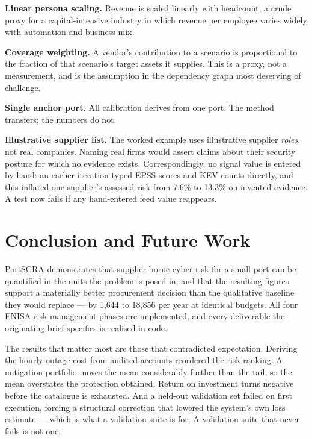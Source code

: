 \documentclass[conference]{IEEEtran}
\newcommand{\eur}{\mbox{\texteuro}}
\begin{document}
\textbf{Linear persona scaling.} Revenue is scaled linearly with headcount, a crude
proxy for a capital-intensive industry in which revenue per employee varies widely
with automation and business mix.

\textbf{Coverage weighting.} A vendor's contribution to a scenario is proportional
to the fraction of that scenario's target assets it supplies. This is a proxy, not a
measurement, and is the assumption in the dependency graph most deserving of
challenge.

\textbf{Single anchor port.} All calibration derives from one port. The method
transfers; the numbers do not.

\textbf{Illustrative supplier list.} The worked example uses illustrative supplier
\emph{roles}, not real companies. Naming real firms would assert claims about their
security posture for which no evidence exists. Correspondingly, no signal value is
entered by hand: an earlier iteration typed EPSS scores and KEV counts directly, and
this inflated one supplier's assessed risk from 7.6\% to 13.3\% on invented
evidence. A test now fails if any hand-entered feed value reappears.

\section{Conclusion and Future Work}

PortSCRA demonstrates that supplier-borne cyber risk for a small port can be
quantified in the units the problem is posed in, and that the resulting figures
support a materially better procurement decision than the qualitative baseline they
would replace --- by \eur{}1{,}644 to \eur{}18{,}856 per year at identical budgets.
All four ENISA risk-management phases are implemented, and every deliverable the
originating brief specifies is realised in code.

The results that matter most are those that contradicted expectation. Deriving the
hourly outage cost from audited accounts reordered the risk ranking. A mitigation
portfolio moves the mean considerably further than the tail, so the mean overstates
the protection obtained. Return on investment turns negative before the catalogue is
exhausted. And a held-out validation set failed on first execution, forcing a
structural correction that lowered the system's own loss estimate --- which is what
a validation suite is for. A validation suite that never fails is not one.
\end{document}

